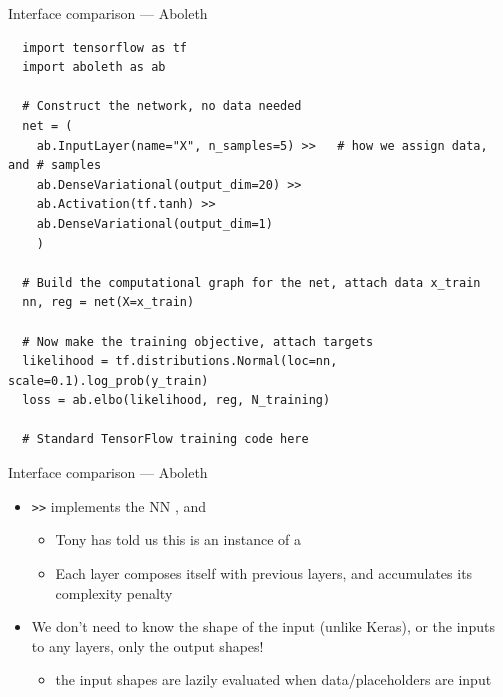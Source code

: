 \documentclass[lualatex, aspectratio=169]{beamer}
\begin{document}
\begin{frame}[fragile]{Interface comparison --- Aboleth}

  \begin{verbatim}
  import tensorflow as tf
  import aboleth as ab

  # Construct the network, no data needed
  net = (
    ab.InputLayer(name="X", n_samples=5) >>   # how we assign data, and # samples 
    ab.DenseVariational(output_dim=20) >>
    ab.Activation(tf.tanh) >>
    ab.DenseVariational(output_dim=1)
    )

  # Build the computational graph for the net, attach data x_train
  nn, reg = net(X=x_train)

  # Now make the training objective, attach targets
  likelihood = tf.distributions.Normal(loc=nn, scale=0.1).log_prob(y_train)
  loss = ab.elbo(likelihood, reg, N_training)

  # Standard TensorFlow training code here

  \end{verbatim}

\end{frame}


\begin{frame}{Interface comparison --- Aboleth}
  
  \begin{itemize}
    \item \texttt{>>} implements the NN , and 
    \begin{itemize}
      \item Tony has told us this is an instance of a 
      \item Each layer composes itself with previous layers, and accumulates its complexity penalty
    \end{itemize}
    \item We don't need to know the shape of the input (unlike Keras), or the inputs to any layers, only the output shapes!
    \begin{itemize}
      \item the input shapes are lazily evaluated when data/placeholders are input
    \end{itemize}
  \end{itemize}

\end{frame}
\end{document}
